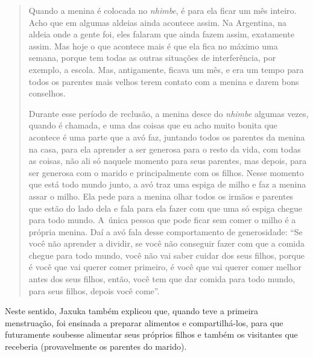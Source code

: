 \begin{quote}
\noindent
Quando a menina é colocada no \emph{nhimbe}, é para ela ficar um mês inteiro.
Acho que em algumas aldeias ainda acontece assim. Na Argentina, na
aldeia onde a gente foi, eles falaram que ainda fazem assim, exatamente
assim. Mas hoje o que acontece mais é que ela fica no máximo uma
semana, porque tem todas as outras situações de interferência, por
exemplo, a escola. Mas, antigamente, ficava um mês, e era um tempo para
todos os parentes mais velhos terem contato com a menina e darem bons
conselhos. 

\noindent
Durante esse período de reclusão, a menina desce do \emph{nhimbe} algumas
vezes, quando é chamada, e uma das coisas que eu acho muito bonita que
acontece é uma parte que a avó faz, juntando todos os parentes da
menina na casa, para ela aprender a ser generosa para o resto da vida,
com todas as coisas, não ali só naquele momento para seus parentes, mas
depois, para ser generosa com o marido e principalmente com os filhos.
Nesse momento que está todo mundo junto, a avó traz uma espiga de milho
e faz a menina assar o milho. Ela pede para a menina olhar todos os
irmãos e parentes que estão do lado dela e fala para ela fazer com que
uma só espiga chegue para todo mundo. A~única pessoa que pode ficar sem
comer o milho é a própria menina. Daí a avó fala desse comportamento de
generosidade: ``Se você não aprender a dividir, se você não conseguir
fazer com que a comida chegue para todo mundo, você não vai saber
cuidar dos seus filhos, porque é você que vai querer comer primeiro, é
você que vai querer comer melhor antes dos seus filhos, então, você tem
que dar comida para todo mundo, para seus filhos, depois você come''. 
\end{quote}

\indent
Neste sentido, Jaxuka também explicou que, quando teve a primeira
menstruação, foi ensinada a preparar alimentos e compartilhá-los, para
que futuramente soubesse alimentar seus próprios filhos e também os
visitantes que receberia (provavelmente os parentes do marido).

\bigskip

